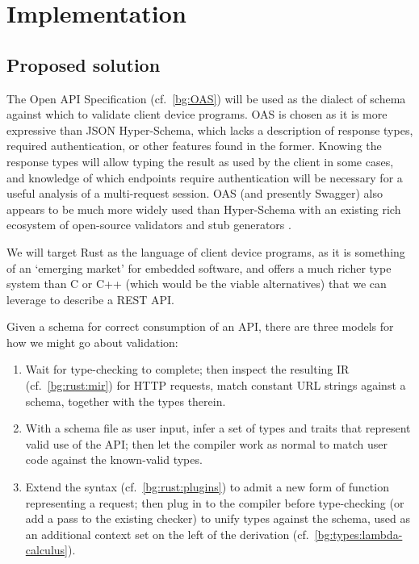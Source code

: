 \section{Implementation}\label{impl}
\subsection{Proposed solution}\label{impl:proposal}
The Open API Specification (cf.~\ref{bg:OAS}) will be used as the dialect of schema against which to validate client device programs. OAS is chosen as it is more expressive than JSON Hyper-Schema, which lacks a description of response types, required authentication, or other features found in the former. Knowing the response types will allow typing the result as used by the client in some cases, and knowledge of which endpoints require authentication will be necessary for a useful analysis of a multi-request session. OAS (and presently Swagger) also appears to be much more widely used than Hyper-Schema \cite{anyone_use_hyperschema} with an existing rich ecosystem of open-source validators and stub generators \cite{swagger_oss}.\label{impl:proposal:schema}

We will target Rust as the language of client device programs, as it is something of an `emerging market' for embedded software, and offers a much richer type system than C or C++ (which would be the viable alternatives) that we can leverage to describe a REST API.\label{impl:proposal:lang}

Given a schema for correct consumption of an API, there are three models for how we might go about validation:
\begin{enumerate}
	\item Wait for type-checking to complete; then inspect the resulting IR (cf.~\ref{bg:rust:mir}) for HTTP requests, match constant URL strings against a schema, together with the types therein.
	\item With a schema file as user input, infer a set of types and traits that represent valid use of the API; then let the compiler work as normal to match user code against the known-valid types.
	\item Extend the syntax (cf.~\ref{bg:rust:plugins}) to admit a new form of function representing a request; then plug in to the compiler before type-checking (or add a pass to the existing checker) to unify types against the schema, used as an additional context set on the left of the derivation (cf.~\ref{bg:types:lambda-calculus}).
\end{enumerate}\label{discussion-models-validation}

